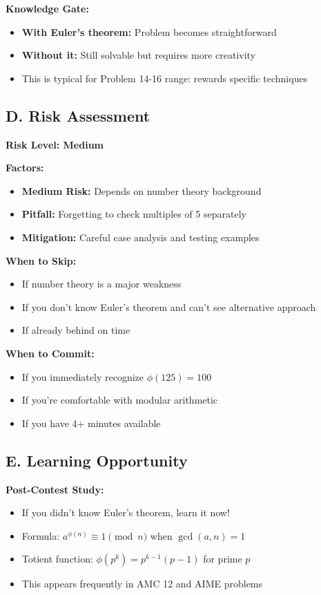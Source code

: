 \documentclass[12pt]{article}
\begin{document}
\begin{competitionbox}
\textbf{Knowledge Gate:}
\begin{itemize}
    \item \textbf{With Euler's theorem:} Problem becomes straightforward
    \item \textbf{Without it:} Still solvable but requires more creativity
    \item This is typical for Problem 14-16 range: rewards specific techniques
\end{itemize}

\subsection*{D. Risk Assessment}

\textbf{Risk Level: Medium}

\textbf{Factors:}
\begin{itemize}
    \item \textbf{Medium Risk:} Depends on number theory background
    \item \textbf{Pitfall:} Forgetting to check multiples of 5 separately
    \item \textbf{Mitigation:} Careful case analysis and testing examples
\end{itemize}

\textbf{When to Skip:}
\begin{itemize}
    \item If number theory is a major weakness
    \item If you don't know Euler's theorem and can't see alternative approach
    \item If already behind on time
\end{itemize}

\textbf{When to Commit:}
\begin{itemize}
    \item If you immediately recognize $\phi(125) = 100$
    \item If you're comfortable with modular arithmetic
    \item If you have 4+ minutes available
\end{itemize}

\subsection*{E. Learning Opportunity}

\textbf{Post-Contest Study:}
\begin{itemize}
    \item If you didn't know Euler's theorem, learn it now!
    \item Formula: $a^{\phi(n)} \equiv 1 \pmod{n}$ when $\gcd(a,n) = 1$
    \item Totient function: $\phi(p^k) = p^{k-1}(p-1)$ for prime $p$
    \item This appears frequently in AMC 12 and AIME problems
\end{itemize}
\end{competitionbox}
\end{document}
